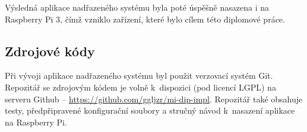 Výsledná aplikace nadřazeného systému byla poté úspěšně nasazena i na Raspberry Pi 3, čímž vzniklo zařízení, které bylo cílem této diplomové práce.

\subsection{Zdrojové kódy}

Při vývoji aplikace nadřazeného systému byl použit verzovací systém Git. Repozitář se zdrojovým kódem je volně k~dispozici (pod licencí LGPL) na serveru Github -- \url{https://github.com/ggljzr/mi-dip-impl}. Repozitář také obsahuje testy, předpřipravené konfigurační soubory a stručný návod k~nasazení aplikace na Raspberry Pi.

